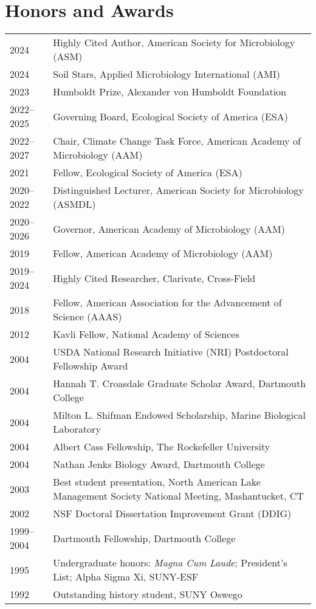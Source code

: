 \documentclass[11pt]{article}
\begin{document}
\section*{Honors and Awards}
\vspace{-1.25em} %
\noindent
\begin{tabularx}{\textwidth}{@{}l@{\hspace{2em}}X@{}}
2024        & Highly Cited Author, American Society for Microbiology (ASM) \\
2024        & Soil Stars, Applied Microbiology International (AMI) \\ 
2023        & Humboldt Prize, Alexander von Humboldt Foundation \\
2022--2025  & Governing Board, Ecological Society of America (ESA) \\
2022--2027  & Chair, Climate Change Task Force, American Academy of Microbiology (AAM) \\
2021        & Fellow, Ecological Society of America (ESA) \\
2020--2022  & Distinguished Lecturer, American Society for Microbiology (ASMDL) \\
2020--2026  & Governor, American Academy of Microbiology (AAM) \\
2019        & Fellow, American Academy of Microbiology (AAM) \\
2019--2024  & Highly Cited Researcher, Clarivate, Cross-Field \\
2018        & Fellow, American Association for the Advancement of Science (AAAS) \\
2012        & Kavli Fellow, National Academy of Sciences \\
2004        & USDA National Research Initiative (NRI) Postdoctoral Fellowship Award \\
2004        & Hannah T. Croasdale Graduate Scholar Award, Dartmouth College \\
2004        & Milton L. Shifman Endowed Scholarship, Marine Biological Laboratory \\
2004        & Albert Cass Fellowship, The Rockefeller University \\
2004        & Nathan Jenks Biology Award, Dartmouth College \\
2003        & Best student presentation, North American Lake Management Society National Meeting, Mashantucket, CT \\
2002        & NSF Doctoral Dissertation Improvement Grant (DDIG) \\
1999--2004  & Dartmouth Fellowship, Dartmouth College \\
1995        & Undergraduate honors: \textit{Magna Cum Laude}; President’s List; Alpha Sigma Xi, SUNY-ESF \\
1992        & Outstanding history student, SUNY Oswego \\
\end{tabularx}
\end{document}
